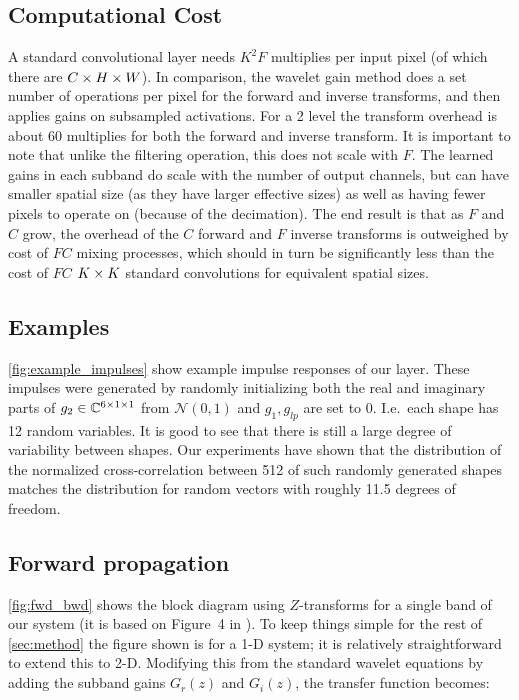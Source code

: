 \subsection{Computational Cost}

A standard convolutional layer needs $K^2 F$ multiplies per input pixel (of
which there are $C\x H\x W$). In comparison, the wavelet gain method does a set
number of operations per pixel for the forward and inverse transforms, and then
applies gains on subsampled activations. For a 2 level \DTCWT the transform
overhead is about 60 multiplies for both the forward and inverse transform. It
is important to note that unlike the filtering operation, this does not scale
with $F$. The learned gains in each subband do scale with the number of output
channels, but can have smaller spatial size (as they have larger effective
sizes) as well as having fewer pixels to operate on (because of the decimation).
The end result is that as $F$ and $C$ grow, the overhead of the $C$ forward and
$F$ inverse transforms is outweighed by cost of $FC$ mixing processes, which
should in turn be significantly less than the cost of $FC$ $K\x K$ standard
convolutions for equivalent spatial sizes.

\subsection{Examples}

\autoref{fig:example_impulses} show example impulse responses of our layer.
These impulses were generated by randomly initializing both the real and
imaginary parts of $g_2 \in \complexes[6\x 1\x 1]$ from $\mathcal{N}(0,1)$ and
$g_1, g_{lp}$ are set to 0. I.e.\ each shape has 12 random variables. It is good
to see that there is still a large degree of variability between shapes. Our
experiments have shown that the distribution of the normalized cross-correlation
between 512 of such randomly generated shapes matches the distribution for
random vectors with roughly 11.5 degrees of freedom.

\subsection{Forward propagation}

\autoref{fig:fwd_bwd} shows the block diagram using $Z$-transforms for a single
band of our system (it is based on Figure~4 in \cite{kingsbury_complex_2001}).
To keep things simple for the rest of \autoref{sec:method} the figure shown is
for a 1-D system; it is relatively straightforward to extend this to
2-D\cite{selesnick_dual-tree_2005}. %
Modifying this from the standard wavelet equations by adding the subband gains
$G_r(z)$ and $G_i(z)$, the transfer function becomes:

